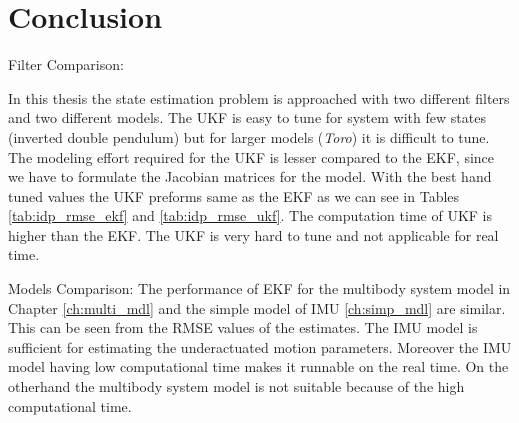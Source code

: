 \chapter{Conclusion}
\label{ch:conclusion}

Filter Comparison:

In this thesis the state estimation problem is approached with two different filters and two different models. The UKF is easy to tune for system with few states (inverted double pendulum) but for larger models (\emph{Toro}) it is difficult to tune. The modeling effort required for the UKF is lesser compared to the EKF, since we have to formulate the Jacobian matrices for the model. With the best hand tuned values the UKF preforms same as the EKF as we can see in Tables \ref{tab:idp_rmse_ekf} and \ref{tab:idp_rmse_ukf}. The computation time of UKF is higher than the EKF. The UKF is very hard to tune and not applicable for real time.

Models Comparison:
The performance of EKF for the multibody system model in Chapter \ref{ch:multi_mdl} and the simple model of IMU \ref{ch:simp_mdl} are similar. This can be seen from the RMSE values of the estimates. The IMU model is sufficient for estimating the underactuated motion parameters. Moreover the IMU model having low computational time makes it runnable on the real time. On the otherhand the multibody system model is not suitable because of the high computational time. 
